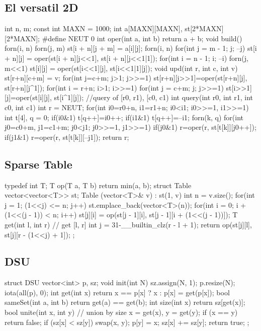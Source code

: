 \documentclass[10pt, landscape, twocolumn, a4paper, notitlepage]{article}
\begin{document}
\subsection{El versatil 2D}
\begin{code}
int n, m; 
const int MAXN = 1000;
int a[MAXN][MAXN], st[2*MAXN][2*MAXN];
#define NEUT 0
int oper(int a, int b) {return a + b;}
void build() {
    forn(i, n) forn(j, m) st[i + n][j + m] = a[i][j];
    forn(i, n) for(int j = m - 1; j; --j)
        st[i + n][j] = oper(st[i + n][j<<1], st[i + n][j<<1|1]);
    for(int i = n - 1; i; --i) forn(j, m<<1) {
        st[i][j] = oper(st[i<<1][j], st[i<<1|1][j]);
    }
}
void upd(int r, int c, int v){
    st[r+n][c+m] = v;
    for(int j=c+m; j>1; j>>=1) st[r+n][j>>1]=oper(st[r+n][j], st[r+n][j^1]);
    for(int i = r+n; i>1; i>>=1) for(int j = c+m; j; j>>=1)
        st[i>>1][j]=oper(st[i][j], st[i^1][j]);
}
//query of [r0, r1), [c0, c1)
int query(int r0, int r1, int c0, int c1) {
    int r = NEUT;
    for(int i0=r0+n, i1=r1+n; i0<i1; i0>>=1, i1>>=1) {
        int t[4], q = 0;
        if(i0&1) t[q++]=i0++;
        if(i1&1) t[q++]=--i1;
        forn(k, q) for(int j0=c0+m, j1=c1+m; j0<j1; j0>>=1, j1>>=1) {
            if(j0&1) r=oper(r, st[t[k]][j0++]);
            if(j1&1) r=oper(r, st[t[k]][--j1]);
        }
    }
    return r;
}
\end{code}
\subsection{Sparse Table}
\begin{code}
typedef int T;
T op(T a, T b) {return min(a, b);}
struct Table{
    vector<vector<T>> st;
    Table (vector<T>& v) : st(1, v) {
        int n = v.size();
        for(int j = 1; (1<<j) <= n; j++) {
            st.emplace_back(vector<T>(n));
            for(int i = 0; i + (1<<(j - 1)) < n; i++) {
                st[j][i] = op(st[j - 1][i], st[j - 1][i + (1<<(j - 1))]);
            }
        }
    }
    T get(int l, int r) { // get [l, r]
        int j = 31-__builtin_clz(r - l + 1);
        return op(st[j][l], st[j][r - (1<<j) + 1]);
    }
};
\end{code}
\subsection{DSU}
\begin{code}
struct DSU {
  vector<int> p, sz;
  void init(int N) { sz.assign(N, 1); p.resize(N); iota(all(p), 0);}
  int get(int x) {return x == p[x] ? x : p[x] = get(p[x]);}
  bool sameSet(int a, int b) { return get(a) == get(b); }
  int size(int x) { return sz[get(x)]; }
  bool unite(int x, int y) {  // union by size
    x = get(x), y = get(y); 
    if (x == y) return false;
    if (sz[x] < sz[y]) swap(x, y);
    p[y] = x; sz[x] += sz[y]; 
    return true;
  }
};
\end{code}
\end{document}
